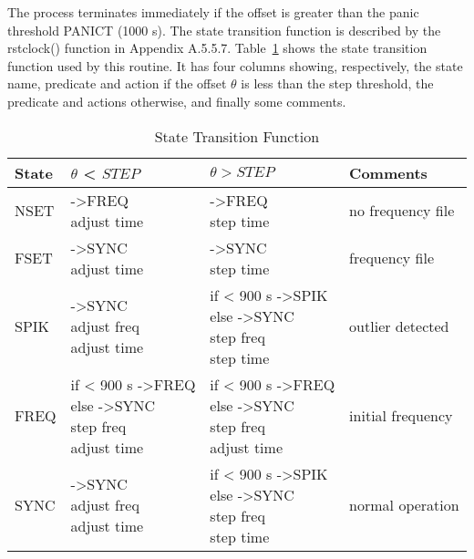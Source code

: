 The process terminates immediately if the offset is greater than the
panic threshold PANICT (1000 s).  The state transition function is
described by the rstclock() function in Appendix A.5.5.7.  Table~\ref{state_transition_function}
shows the state transition function used by this routine.  It has
four columns showing, respectively, the state name, predicate and
action if the offset $ \theta $ is less than the step threshold, the
predicate and actions otherwise, and finally some comments.

\begin{table}[htb]
\center
\begin{tabular}{| l | l | l | l |}
\hline
State & $ \theta $ < $ STEP $        & $ \theta > STEP $      & Comments \\
\hline
\hline
NSET & \makecell[l]{->FREQ \\ adjust time} & \makecell[l]{->FREQ \\ step time} & no frequency file \\
FSET & \makecell[l]{->SYNC \\ adjust time} & \makecell[l]{->SYNC \\ step time} & frequency file \\
SPIK & \makecell[l]{->SYNC \\ adjust freq \\ adjust time} & \makecell[l]{if < 900 s ->SPIK \\ else ->SYNC \\ step freq \\ step time} & outlier detected \\
FREQ & \makecell[l]{if < 900 s ->FREQ \\ else ->SYNC \\ step freq \\ adjust time} & \makecell[l]{if < 900 s ->FREQ \\ else ->SYNC \\ step freq \\ adjust time} & initial frequency \\
SYNC & \makecell[l]{->SYNC \\ adjust freq \\ adjust time} & \makecell[l]{if < 900 s ->SPIK \\ else ->SYNC \\ step freq \\ step time} & normal operation \\
\hline
\end{tabular}
\caption{State Transition Function}
\label{state_transition_function}
\end{table}

